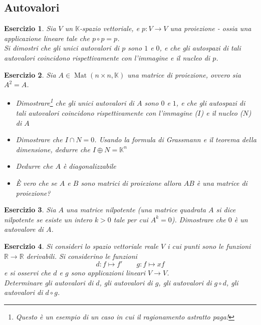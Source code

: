 \documentclass{article}
\newtheorem{es}{Esercizio}
\begin{document}
{\subsection{Autovalori}




\begin{es}
    Sia $V$ un $\mathbb{K}$-spazio vettoriale, e $p:V\to V$ una proiezione - ossia una applicazione lineare tale che $p\circ p =p$.\\
    Si dimostri che gli unici autovalori di $p$ sono $1$ e $0$, e che gli autospazi di tali autovalori coincidono rispettivamente con l'immagine e il nucleo di $p$.\\
\end{es}

\begin{es}
    Sia $A\in\operatorname{Mat}(n\times n,\mathbb{K})$ una matrice di proiezione, ovvero sia $A^2=A$.\\
    \begin{itemize}
        \item Dimostrare\footnote{Questo è un esempio di un caso in cui il ragionamento astratto paga!} che gli unici autovalori di $A$ sono $0$ e $1$, e che gli autospazi di tali autovalori coincidono rispettivamente con l'immagine ($I$) e il nucleo ($N$) di $A$ 
        \item Dimostrare che $I\cap N=0$. Usando la formula di Grassmann e il teorema della dimensione, dedurre che $I\oplus N=\mathbb{K}^n$
        \item Dedurre che $A$ è diagonalizzabile
        \item È vero che se $A$ e $B$ sono matrici di proiezione allora $AB$ è una matrice di proiezione?
    \end{itemize}
\end{es}



\begin{es}
    Sia $A$ una matrice nilpotente (una matrice quadrata $A$ si dice nilpotente se esiste un intero $k> 0$ tale per cui $A^k=0$). Dimostrare che $0$ è un autovalore di $A$.
\end{es}



\begin{es}
    Si consideri lo spazio vettoriale reale $V$ i cui punti sono le funzioni $\mathbb{R}\to\mathbb{R}$ derivabili. Si considerino le funzioni $$d:f\mapsto f'\qquad g:f\mapsto xf$$
    e si osservi che $d$ e $g$ sono applicazioni lineari $V\to V$.\\
    Determinare gli autovalori di $d$, gli autovalori di $g$, gli autovalori di $g\circ d$, gli autovalori di $d\circ g$.
    

\end{es}}
\end{document}
